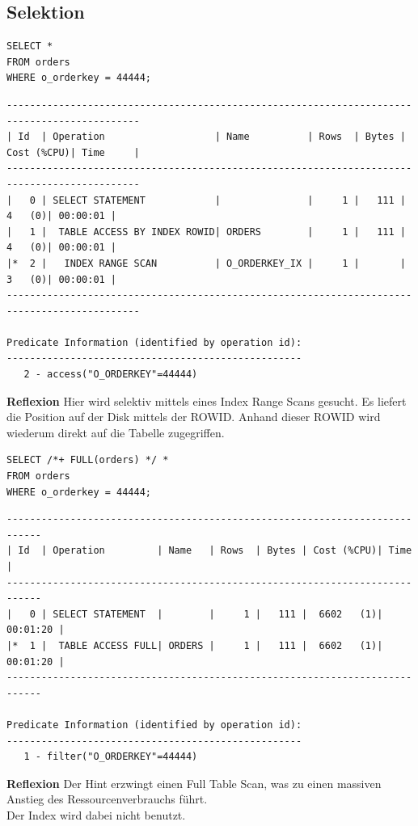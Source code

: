 \documentclass[10pt]{article}
\begin{document}
\subsection{Selektion}
\begin{lstlisting}[style=sql]
SELECT *
FROM orders
WHERE o_orderkey = 44444;
\end{lstlisting}
\begin{lstlisting}[style=queryexecutionplan]
---------------------------------------------------------------------------------------------
| Id  | Operation                   | Name          | Rows  | Bytes | Cost (%CPU)| Time     |
---------------------------------------------------------------------------------------------
|   0 | SELECT STATEMENT            |               |     1 |   111 |     4   (0)| 00:00:01 |
|   1 |  TABLE ACCESS BY INDEX ROWID| ORDERS        |     1 |   111 |     4   (0)| 00:00:01 |
|*  2 |   INDEX RANGE SCAN          | O_ORDERKEY_IX |     1 |       |     3   (0)| 00:00:01 |
---------------------------------------------------------------------------------------------

Predicate Information (identified by operation id):
---------------------------------------------------
   2 - access("O_ORDERKEY"=44444)
\end{lstlisting}
\textbf{Reflexion} \newline
Hier wird selektiv mittels eines Index Range Scans gesucht. Es liefert die Position auf 
der Disk mittels der ROWID. Anhand dieser ROWID wird wiederum direkt auf die Tabelle 
zugegriffen.

\begin{lstlisting}[style=sql]
SELECT /*+ FULL(orders) */ *
FROM orders
WHERE o_orderkey = 44444;
\end{lstlisting}
\begin{lstlisting}[style=queryexecutionplan]
----------------------------------------------------------------------------
| Id  | Operation         | Name   | Rows  | Bytes | Cost (%CPU)| Time     |
----------------------------------------------------------------------------
|   0 | SELECT STATEMENT  |        |     1 |   111 |  6602   (1)| 00:01:20 |
|*  1 |  TABLE ACCESS FULL| ORDERS |     1 |   111 |  6602   (1)| 00:01:20 |
----------------------------------------------------------------------------

Predicate Information (identified by operation id):
---------------------------------------------------
   1 - filter("O_ORDERKEY"=44444)
\end{lstlisting}
\textbf{Reflexion} \newline
Der Hint erzwingt einen Full Table Scan, was zu einen massiven Anstieg des Ressourcenverbrauchs führt.\\
Der Index wird dabei nicht benutzt.
\end{document}
